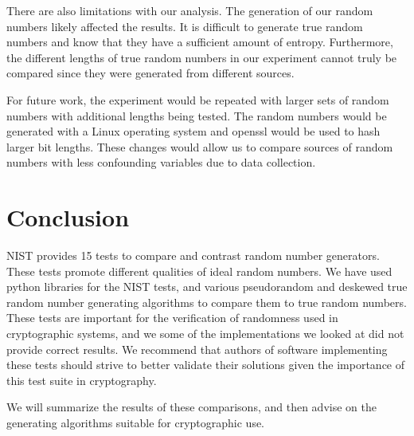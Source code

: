 \documentclass[11pt,letterpaper,conference]{IEEEtran}
\begin{document}
There are also limitations with our analysis. The generation of our random numbers likely affected the
results. It is difficult to generate true random numbers and know that they have a sufficient amount
of entropy. Furthermore, the different lengths of true random numbers in our experiment cannot truly
be compared since they were generated from different sources.

For future work, the experiment would be repeated with larger sets of random numbers with additional
lengths being tested. The random numbers would be generated with a Linux operating system and openssl
would be used to hash larger bit lengths. These changes would allow us to compare sources of random
numbers with less confounding variables due to data collection. 


\section{Conclusion}
NIST provides 15 tests to compare and contrast random number generators. These tests promote different
qualities of ideal random numbers. We have used python libraries for the NIST tests, and
various pseudorandom and deskewed true random number generating algorithms to compare them to true
random numbers. These tests are important for the verification of randomness used in cryptographic systems, and we some of the implementations we looked at did not provide correct results. We recommend that authors of software implementing these tests should strive to better validate their solutions given the importance of this test suite in cryptography.

We will summarize the results of these comparisons, and then advise on the generating
algorithms suitable for cryptographic use.

\printbibliography[heading=bibintoc, title={References}]
\end{document}
